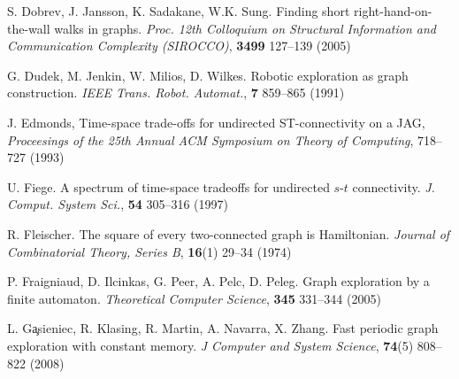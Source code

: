 \documentclass[12pt,letterpaper,oneside]{book}
\begin{document}
\begin{thebibliography}{9}

 S. Dobrev, J. Jansson, K. Sadakane, W.K. Sung.  Finding short 
right-hand-on-the-wall walks in graphs.  \emph{Proc. 12th Colloquium on Structural Information and 
Communication Complexity (SIROCCO)}, \textbf{3499} 127--139 (2005)   %

 G. Dudek, M. Jenkin, W. Milios, D. Wilkes.  Robotic exploration as graph construction.  
\emph{IEEE Trans. Robot. Automat.}, \textbf{7} 859--865 (1991)


 J. Edmonds, Time-space trade-offs for undirected ST-connectivity on a JAG, \emph{Proceesings of the 
25th Annual ACM Symposium on Theory of Computing}, 718--727 (1993)



 U. Fiege.  A spectrum of time-space tradeoffs for undirected $s$-$t$ connectivity.  
\emph{J. Comput. System Sci.}, \textbf{54} 305--316 (1997) 

 R. Fleischer.  The square of every two-connected graph is Hamiltonian.  \emph{Journal of Combinatorial Theory, Series B},  
\textbf{16}(1) 29--34 (1974) 






 P. Fraigniaud, D. Ilcinkas, G. Peer, A. Pelc, D. Peleg.  Graph exploration by a finite automaton.  \emph{Theoretical 
Computer Science}, \textbf{345} 331--344 (2005)   




 L. G\c{a}sieniec, R. Klasing, R. Martin, A. Navarra, X. Zhang.  Fast 
periodic graph exploration with constant memory.  \emph{J Computer and System Science}, 
\textbf{74}(5) 808--822 (2008)   


\end{thebibliography}
\end{document}
